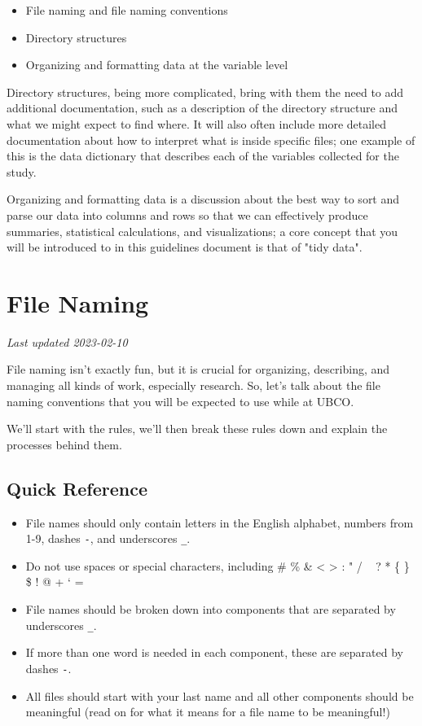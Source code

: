 \documentclass[
]{book}
\providecommand{\tightlist}{%
  \setlength{\itemsep}{0pt}\setlength{\parskip}{0pt}}
\begin{document}
\begin{itemize}
\tightlist
\item
  File naming and file naming conventions
\item
  Directory structures
\item
  Organizing and formatting data at the variable level
\end{itemize}

Directory structures, being more complicated, bring with them the need to add additional documentation, such as a description of the directory structure and what we might expect to find where. It will also often include more detailed documentation about how to interpret what is inside specific files; one example of this is the data dictionary that describes each of the variables collected for the study.

Organizing and formatting data is a discussion about the best way to sort and parse our data into columns and rows so that we can effectively produce summaries, statistical calculations, and visualizations; a core concept that you will be introduced to in this guidelines document is that of "tidy data".

\hypertarget{file-naming}{%
\chapter{File Naming}\label{file-naming}}

\emph{Last updated 2023-02-10}

File naming isn't exactly fun, but it is crucial for organizing, describing, and managing all kinds of work, especially research. So, let's talk about the file naming conventions that you will be expected to use while at UBCO.

We'll start with the rules, we'll then break these rules down and explain the processes behind them.

\hypertarget{quick-reference}{%
\section{Quick Reference}\label{quick-reference}}

\begin{itemize}
\tightlist
\item
  File names should only contain letters in the English alphabet, numbers from 1-9, dashes \texttt{-}, and underscores \texttt{\_}.
\item
  Do not use spaces or special characters, including \# \% \& \textless{} \textgreater{} : " / ~\textbar{} ? * \{ \} \$ ! \textquotesingle{} @ + ` =
\item
  File names should be broken down into components that are separated by underscores \texttt{\_}.
\item
  If more than one word is needed in each component, these are separated by dashes \texttt{-}.
\item
  All files should start with your last name and all other components should be meaningful (read on for what it means for a file name to be meaningful!)
\end{itemize}
\end{document}
